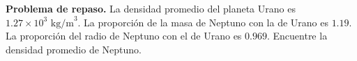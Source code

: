 \item \textbf{Problema de repaso.} La densidad promedio del planeta Urano es $1.27 \times 10^3 \text{ kg/m}^3$. La proporción de la masa de Neptuno con la de Urano es $1.19$. La proporción del radio de Neptuno con el de Urano es $0.969$. Encuentre la densidad promedio de Neptuno.
